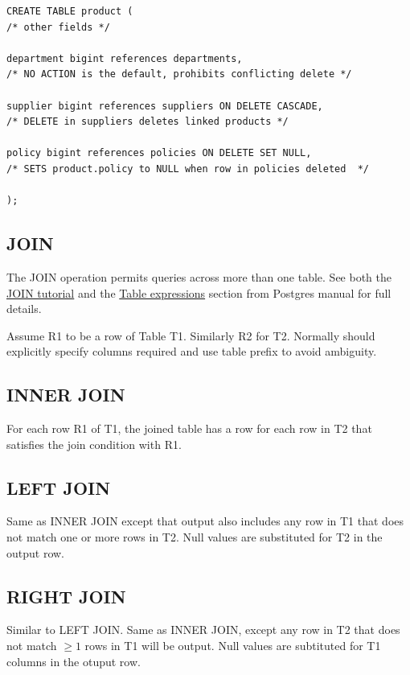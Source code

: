 \documentclass[slides]{pgnotes}
\begin{document}
\begin{verbatim}
CREATE TABLE product ( 
/* other fields */

department bigint references departments, 
/* NO ACTION is the default, prohibits conflicting delete */

supplier bigint references suppliers ON DELETE CASCADE,
/* DELETE in suppliers deletes linked products */

policy bigint references policies ON DELETE SET NULL,
/* SETS product.policy to NULL when row in policies deleted  */

);
\end{verbatim}

\subsection{JOIN}\label{join}

The JOIN operation permits queries across more than one table. See both
the
\href{https://www.postgresql.org/docs/current/tutorial-join.html}{JOIN
tutorial} and the
\href{https://www.postgresql.org/docs/13/queries-table-expressions.html}{Table
expressions} section from Postgres manual for full details.

Assume R1 to be a row of Table T1. Similarly R2 for T2. Normally should
explicitly specify columns required and use table prefix to avoid
ambiguity.

\subsection{INNER JOIN}\label{inner-join}

For each row R1 of T1, the joined table has a row for each row in T2
that satisfies the join condition with R1.

\subsection{LEFT JOIN}\label{left-join}

Same as INNER JOIN except that output also includes any row in T1 that
does not match one or more rows in T2. Null values are substituted for
T2 in the output row.

\subsection{RIGHT JOIN}\label{right-join}

Similar to LEFT JOIN. Same as INNER JOIN, except any row in T2 that does
not match \(\ge 1\) rows in T1 will be output. Null values are
subtituted for T1 columns in the otuput row.
\end{document}
